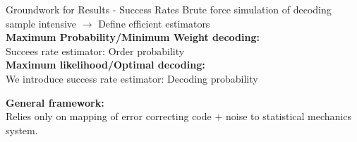 \documentclass{dfki}
\begin{document}
\begin{frame}{Groundwork for Results - Success Rates}
	Brute force simulation of decoding sample intensive $\rightarrow$ Define efficient estimators\\
	\pause
	\vspace{0.5cm}
	\textbf{Maximum Probability/Minimum Weight decoding:}\\
	Succees rate estimator: Order probability~\\
	\pause
	\vspace{0.5cm}
	\textbf{Maximum likelihood/Optimal decoding:}\\
	We introduce success rate estimator: Decoding probability
	\pause
	\begin{tcolorbox}[colback=osakared!5!white, colframe=osakared, width=13cm, arc=2mm]
		\textbf{General framework:}\\ Relies only on mapping of error correcting code $+$ noise to statistical mechanics system.
	\end{tcolorbox}
\end{frame}
\end{document}
